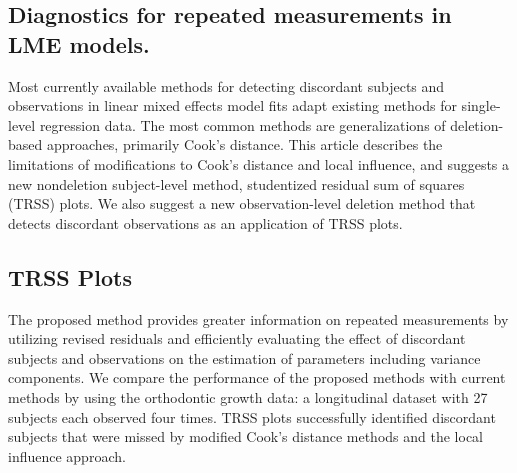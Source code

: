 \documentclass[Main.tex]{subfiles}
\begin{document}
	
\subsection*{Diagnostics for repeated measurements in LME  models.}

Most currently available methods for detecting discordant subjects and observations in linear mixed effects model fits adapt existing methods for single-level regression data. The most common methods are generalizations of deletion-based approaches, primarily Cook's distance. This article describes the limitations of modifications to Cook's distance and local influence, and suggests a new nondeletion subject-level method, studentized residual sum of squares (TRSS) plots. We also suggest a new observation-level deletion method that detects discordant observations as an application of TRSS plots. 

\subsection*{TRSS Plots}
The proposed method provides greater information on repeated measurements by utilizing revised residuals and efficiently evaluating the effect of discordant subjects and observations on the estimation of parameters including variance components. We compare the performance of the proposed methods with current methods by using the orthodontic growth data: a longitudinal dataset with 27 subjects each observed four times. TRSS plots successfully identified discordant subjects that were missed by modified Cook's distance methods and the local influence approach. 

\newpage
\end{document}
